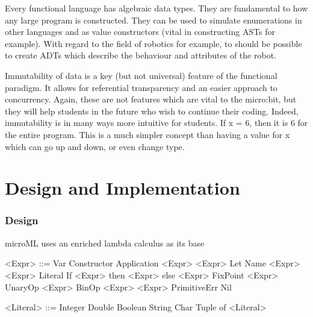 \documentclass[12pt, a4paper]{report}
\begin{document}
Every functional language has algebraic data types. They are fundamental to how any large program is
constructed. They can be used to simulate enumerations in other languages and as value constructors
(vital in constructing ASTs for example). With regard to the field of robotics for example, to
should be possible to create ADTs which describe the behaviour and attributes of the robot.

Immutability of data is a key (but not universal) feature of the functional paradigm. It allows for
referential transparency and an easier approach to concurrency. Again, these are not features which
are vital to the micro:bit, but they will help students in the future who wish to continue their
coding. Indeed, immutability is in many ways more intuitive for students. If x = 6, then it is 6 for
the entire program. This is a much simpler concept than having a value for x which can go up and down,
or even change type.


\chapter{Design and Implementation}

\subsection{Design}
microML uses an enriched lambda calculus as its base
\vspace{5mm}

\begin{minipage}[t]{0.5\textwidth}
    \begin{grammar}
        <Expr> ::= Var
        \alt{} Constructor 
        \alt{} Application <Expr> <Expr>
        \alt{} Let Name <Expr> <Expr>
        \alt{} Literal 
        \alt{} If <Expr> then <Expr> else <Expr>
        \alt{} FixPoint <Expr>
        \alt{} UnaryOp <Expr>
        \alt{} BinOp <Expr> <Expr>
        \alt{} PrimitiveErr 
        \alt{} Nil
    \end{grammar}
\end{minipage}
\begin{minipage}[t]{0.5\textwidth}
    \begin{grammar}
        <Literal> ::= Integer
        \alt{} Double
        \alt{} Boolean
        \alt{} String
        \alt{} Char
        \alt{} Tuple of <Literal>
    \end{grammar}
\end{minipage}
\vspace{5mm}
\end{document}
